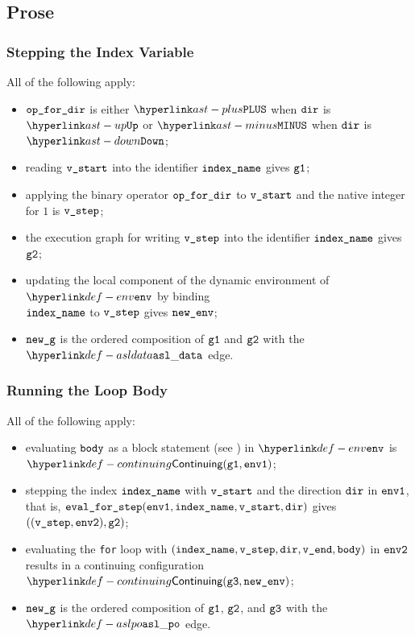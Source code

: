\subsection{Prose}
\subsubsection{Stepping the Index Variable}
All of the following apply:
\begin{itemize}
  \item $\texttt{op\_for\_dir}$ is either $\PLUS$ when $\texttt{dir}$ is $\UP$ or $\MINUS$ when $\texttt{dir}$ is $\DOWN$;
  \item reading $\texttt{v\_start}$ into the identifier $\texttt{index\_name}$ gives $\texttt{g1}$;
  \item applying the binary operator $\texttt{op\_for\_dir}$ to $\texttt{v\_start}$ and the native integer for $1$ is $\texttt{v\_step}$;
  \item the execution graph for writing $\texttt{v\_step}$ into the identifier $\texttt{index\_name}$ gives $\texttt{g2}$;
  \item updating the local component of the dynamic environment of $\env$ by binding \\ $\texttt{index\_name}$ to $\texttt{v\_step}$
  gives $\texttt{new\_env}$;
  \item $\texttt{new\_g}$ is the ordered composition of $\texttt{g1}$ and $\texttt{g2}$ with the $\asldata$ edge.
\end{itemize}

\subsubsection{Running the Loop Body}
All of the following apply:
\begin{itemize}
  \item evaluating $\texttt{body}$ as a block statement (see ) in $\env$
  is \\ $\Continuing(\vgone, \envone)$\ProseTerminateAs{\ReturningConfig, \ThrowingConfig, \DynErrorConfig};
  \item stepping the index $\texttt{index\_name}$ with $\texttt{v\_start}$ and the direction $\texttt{dir}$ in $\texttt{env1}$,
  that is, $\texttt{eval\_for\_step}(\texttt{env1}, \texttt{index\_name}, \texttt{v\_start}, \texttt{dir})$ gives $((\texttt{v\_step}, \texttt{env2}), \texttt{g2})$;
  \item evaluating the \texttt{for} loop with $(\texttt{index\_name}, \texttt{v\_step}, \texttt{dir}, \texttt{v\_end}, \texttt{body})$
  in $\texttt{env2}$ results in a continuing configuration $\Continuing(\vgthree, \newenv)$\ProseTerminateAs{\ReturningConfig, \ThrowingConfig, \DynErrorConfig};
  \item $\texttt{new\_g}$ is the ordered composition of $\texttt{g1}$, $\texttt{g2}$, and $\texttt{g3}$ with the $\aslpo$
  edge.
\end{itemize}

